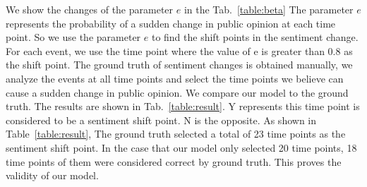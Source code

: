 \documentclass[runningheads]{llncs}
\begin{document}

We show the changes of the parameter $e$ in the Tab.~\ref{table:beta} The parameter $e$ represents the probability of a sudden change in public opinion at each time point. So we use the parameter $e$ to find the shift points in the sentiment change. For each event, we use the time point where the value of e is greater than 0.8 as the shift point. The ground truth of sentiment changes is obtained manually, we analyze the events at all time points and select the time points we believe can cause a sudden change in public opinion. We compare our model to the ground truth. The results are shown in Tab.~\ref{table:result}. Y represents this time point is considered to be a sentiment shift point. N is the opposite. As shown in Table~\ref{table:result}, The ground truth selected a total of 23 time points as the sentiment shift point. In the case that our model only selected 20 time points, 18 time points of them were considered correct by ground truth. This proves the validity of our model.
\end{document}
